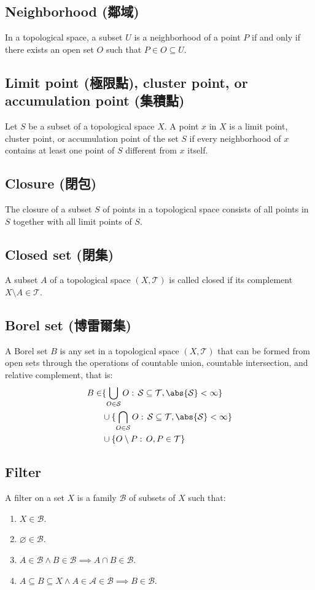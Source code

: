 \documentclass[a4paper,12pt]{article}
\begin{document}
\subsection{Neighborhood (鄰域)}
In a topological space, a subset $U$ is a neighborhood of a point $P$ if and only if there exists an open set $O$ such that $P\in O\subseteq U$.
\subsection{Limit point (極限點), cluster point, or accumulation point (集積點)}
Let $S$ be a subset of a topological space $X$. A point $x$ in $X$ is a limit point, cluster point, or accumulation point of the set $S$ if every neighborhood of $x$ contains at least one point of $S$ different from $x$ itself.
\subsection{Closure (閉包)}
The closure of a subset $S$ of points in a topological space consists of all points in $S$ together with all limit points of $S$.
\subsection{Closed set (閉集)}
A subset $A$ of a topological space $(X,\mathcal{T})$ is called closed if its complement $X\setminus A\in\mathcal{T}$.
\subsection{Borel set (博雷爾集)}
A Borel set $B$ is any set in a topological space $(X,\mathcal{T})$ that can be formed from open sets through the operations of countable union, countable intersection, and relative complement, that is:
\[\begin{aligned}
B\in &\{\bigcup_{O\in\mathcal{S}}O:\,\mathcal{S}\subseteq\mathcal{T},\abs{\mathcal{S}}<\infty\}\\
& \cup \{\bigcap_{O\in\mathcal{S}}O:\,\mathcal{S}\subseteq\mathcal{T},\abs{\mathcal{S}}<\infty\}\\
& \cup \{O\setminus P:\,O,P\in\mathcal{T}\}
\end{aligned}\]
\subsection{Filter}
A filter on a set $X$ is a family $\mathcal{B}$ of subsets of $X$ such that: 
\begin{enumerate}
\item $X\in\mathcal{B}$.
\item $\varnothing\in\mathcal{B}$.
\item $A\in\mathcal{B}\land B\in\mathcal{B}\implies A\cap B\in\mathcal{B}$.
\item $A\subseteq B\subseteq X\land A\in\mathcal{A}\in\mathcal{B}\implies B\in\mathcal{B}$.
\end{enumerate}
\end{document}
